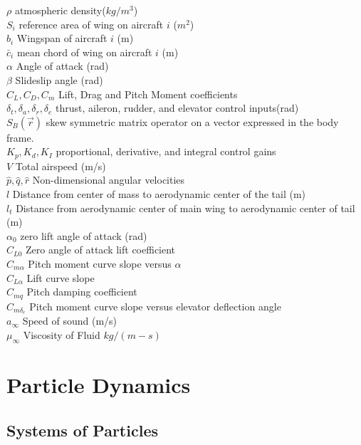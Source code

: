 \documentclass{article}
\begin{document}
\begin{tabbing}
  $\rho$ \> atmospheric density($kg/m^3$) \\
  $S_i$ \> reference area of wing on aircraft $i$ ($m^2$) \\
  $b_i$ \> Wingspan of aircraft $i$ (m) \\
  $\bar{c}_i$ \> mean chord of wing on aircraft $i$ (m) \\
  $\alpha$ \> Angle of attack (rad) \\
  $\beta$ \> Slideslip angle (rad) \\
  $C_L,C_D,C_m$ \> Lift, Drag and Pitch Moment coefficients \\
  $\delta_t,\delta_a,\delta_r,\delta_e$ \> thrust, aileron, rudder,
  and elevator control inputs(rad) \\
  $S_B(\vec{r})$ \> skew symmetric matrix operator on a vector
  expressed in the body frame. \\
  $K_p,K_d,K_I$ \> proportional, derivative, and integral control
  gains\\
  $V$ \> Total airspeed (m/s) \\
  $\hat{p},\hat{q},\hat{r}$ \> Non-dimensional angular velocities \\
  $l$ \> Distance from center of mass to aerodynamic center of the
  tail (m) \\
  $l_t$ \> Distance from aerodynamic center of main wing to
  aerodynamic center of tail (m) \\
  $\alpha_0$ \> zero lift angle of attack (rad) \\
  $C_{L0}$ \> Zero angle of attack lift coefficient \\
  $C_{m\alpha}$ \> Pitch moment curve slope versus $\alpha$ \\
  $C_{L\alpha}$ \> Lift curve slope \\
  $C_{mq}$ \> Pitch damping coefficient \\
  $C_{m\delta_e}$ \> Pitch moment curve slope versus elevator
  deflection angle \\
  $a_{\infty}$ \> Speed of sound (m/s) \\
  $\mu_{\infty}$ \> Viscosity of Fluid $kg/(m-s)$ \\
\end{tabbing}

\section{Particle Dynamics}

\subsection{Systems of Particles}
\end{document}
